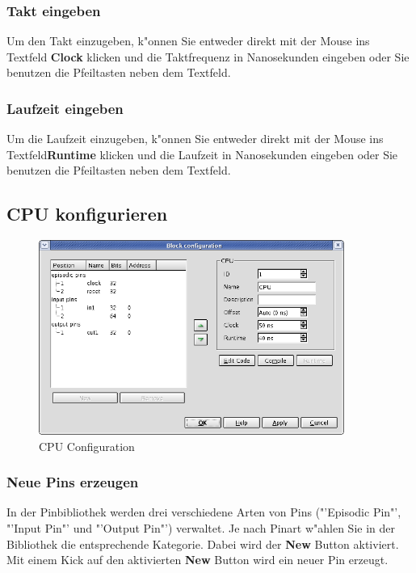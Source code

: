 \documentclass[a4paper,titlepage,12pt,ngerman]{scrbook}
\begin{document}
\subsubsection{Takt eingeben}
Um den Takt einzugeben, k"onnen Sie entweder direkt mit der Mouse ins Textfeld {\bf Clock} klicken und die Taktfrequenz in Nanosekunden eingeben oder Sie benutzen die Pfeiltasten neben dem Textfeld. 
\subsubsection{Laufzeit eingeben}
Um die Laufzeit einzugeben, k"onnen Sie entweder direkt mit der Mouse ins Textfeld{\bf Runtime} klicken und die Laufzeit in Nanosekunden eingeben oder Sie benutzen die Pfeiltasten neben dem Textfeld. 




\subsection{CPU konfigurieren}
\begin{figure}[htbp]

\begin{center}

\includegraphics[width=10cm]{CPUConfiguration}

\caption{CPU Configuration}\label{test}

\end{center}

\end{figure}
\subsubsection{Neue Pins erzeugen}
In der Pinbibliothek werden drei verschiedene Arten von Pins ("'Episodic Pin"', "'Input Pin"' und "'Output Pin"') verwaltet. Je nach Pinart w"ahlen Sie in der Bibliothek die entsprechende Kategorie. Dabei wird der {\bf New} Button aktiviert. Mit einem Kick auf den aktivierten {\bf New} Button wird ein neuer Pin erzeugt. \par
\end{document}
